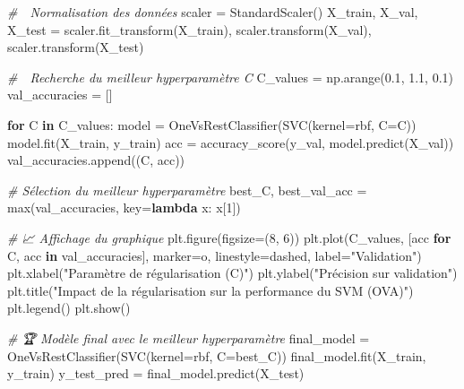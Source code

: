 \documentclass[
  letterpaper,
  DIV=11,
  numbers=noendperiod]{scrartcl}
\newenvironment{Shaded}{}{}
\newcommand{\BuiltInTok}[1]{\textcolor[rgb]{0.00,0.50,0.00}{#1}}
\newcommand{\CommentTok}[1]{\textcolor[rgb]{0.38,0.63,0.69}{\textit{#1}}}
\newcommand{\ControlFlowTok}[1]{\textcolor[rgb]{0.00,0.44,0.13}{\textbf{#1}}}
\newcommand{\DecValTok}[1]{\textcolor[rgb]{0.25,0.63,0.44}{#1}}
\newcommand{\FloatTok}[1]{\textcolor[rgb]{0.25,0.63,0.44}{#1}}
\newcommand{\KeywordTok}[1]{\textcolor[rgb]{0.00,0.44,0.13}{\textbf{#1}}}
\newcommand{\NormalTok}[1]{#1}
\newcommand{\OperatorTok}[1]{\textcolor[rgb]{0.40,0.40,0.40}{#1}}
\newcommand{\StringTok}[1]{\textcolor[rgb]{0.25,0.44,0.63}{#1}}
\begin{document}
\begin{Shaded}
\begin{Highlighting}[]
\CommentTok{\# 🔢 Normalisation des données}
\NormalTok{scaler }\OperatorTok{=}\NormalTok{ StandardScaler()}
\NormalTok{X\_train, X\_val, X\_test }\OperatorTok{=}\NormalTok{ scaler.fit\_transform(X\_train), scaler.transform(X\_val), scaler.transform(X\_test)}

\CommentTok{\# 🎯 Recherche du meilleur hyperparamètre C}
\NormalTok{C\_values }\OperatorTok{=}\NormalTok{ np.arange(}\FloatTok{0.1}\NormalTok{, }\FloatTok{1.1}\NormalTok{, }\FloatTok{0.1}\NormalTok{)}
\NormalTok{val\_accuracies }\OperatorTok{=}\NormalTok{ []}

\ControlFlowTok{for}\NormalTok{ C }\KeywordTok{in}\NormalTok{ C\_values:}
\NormalTok{    model }\OperatorTok{=}\NormalTok{ OneVsRestClassifier(SVC(kernel}\OperatorTok{=}\StringTok{\textquotesingle{}rbf\textquotesingle{}}\NormalTok{, C}\OperatorTok{=}\NormalTok{C))}
\NormalTok{    model.fit(X\_train, y\_train)}
\NormalTok{    acc }\OperatorTok{=}\NormalTok{ accuracy\_score(y\_val, model.predict(X\_val))}
\NormalTok{    val\_accuracies.append((C, acc))}

\CommentTok{\# Sélection du meilleur hyperparamètre}
\NormalTok{best\_C, best\_val\_acc }\OperatorTok{=} \BuiltInTok{max}\NormalTok{(val\_accuracies, key}\OperatorTok{=}\KeywordTok{lambda}\NormalTok{ x: x[}\DecValTok{1}\NormalTok{])}


\CommentTok{\# 📈 Affichage du graphique}
\NormalTok{plt.figure(figsize}\OperatorTok{=}\NormalTok{(}\DecValTok{8}\NormalTok{, }\DecValTok{6}\NormalTok{))}
\NormalTok{plt.plot(C\_values, [acc }\ControlFlowTok{for}\NormalTok{ C, acc }\KeywordTok{in}\NormalTok{ val\_accuracies], marker}\OperatorTok{=}\StringTok{\textquotesingle{}o\textquotesingle{}}\NormalTok{, linestyle}\OperatorTok{=}\StringTok{\textquotesingle{}dashed\textquotesingle{}}\NormalTok{, label}\OperatorTok{=}\StringTok{"Validation"}\NormalTok{)}
\NormalTok{plt.xlabel(}\StringTok{"Paramètre de régularisation (C)"}\NormalTok{)}
\NormalTok{plt.ylabel(}\StringTok{"Précision sur validation"}\NormalTok{)}
\NormalTok{plt.title(}\StringTok{"Impact de la régularisation sur la performance du SVM (OVA)"}\NormalTok{)}
\NormalTok{plt.legend()}
\NormalTok{plt.show()}

\CommentTok{\# 🏆 Modèle final avec le meilleur hyperparamètre}
\NormalTok{final\_model }\OperatorTok{=}\NormalTok{ OneVsRestClassifier(SVC(kernel}\OperatorTok{=}\StringTok{\textquotesingle{}rbf\textquotesingle{}}\NormalTok{, C}\OperatorTok{=}\NormalTok{best\_C))}
\NormalTok{final\_model.fit(X\_train, y\_train)}
\NormalTok{y\_test\_pred }\OperatorTok{=}\NormalTok{ final\_model.predict(X\_test)}


\end{Highlighting}
\end{Shaded}
\end{document}
